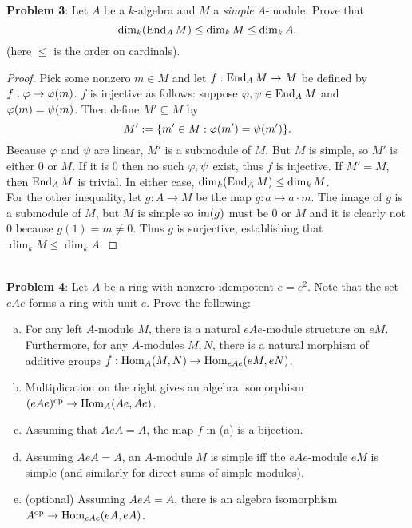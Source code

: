 \documentclass{amsart}
\begin{document}
\newpage
\noindent \textbf{Problem 3}: Let $A$ be a $k$-algebra and $M$ a \textit{simple} $A$-module. Prove that 
$$\dim_k(\operatorname{End}_A M) \leq \dim_k M \leq \dim_k A.$$
(here $\leq$ is the order on cardinals).

\begin{proof}
	Pick some nonzero $m\in M$ and let $f:\operatorname{End}_A M \to M$ be defined by $f:\varphi\mapsto \varphi(m)$. $f$ is injective as follows: suppose $\varphi,\psi\in \operatorname{End}_A M$ and $\varphi(m)=\psi(m)$. Then define $M'\subseteq M$ by
	$$
	M' := \{m'\in M: \varphi(m')=\psi(m')\}.
	$$
	Because $\varphi$ and $\psi$ are linear, $M'$ is a submodule of $M$. But $M$ is simple, so $M'$ is either $0$ or $M$. If it is $0$ then no such $\varphi,\psi$ exist, thus $f$ is injective. If $M'=M$, then $\operatorname{End}_A M$ is trivial. In either case, $\dim_k(\operatorname{End}_AM) \leq \dim_k M$.\\
	
	For the other inequality, let $g:A\to M$ be the map $g:a\mapsto a\cdot m$. The image of $g$ is a submodule of $M$, but $M$ is simple so $\operatorname{im}(g)$ must be $0$ or $M$ and it is clearly not $0$ because $g(1)=m\neq 0$. Thus $g$ is surjective, establishing that $\dim_kM \leq \dim_k A$.
\end{proof}\\

\newpage
\noindent \textbf{Problem 4}: Let $A$ be a ring with nonzero idempotent $e=e^2$. Note that the set $eAe$ forms a ring with unit $e$. Prove the following:
\begin{enumerate}[(a)]
	\item For any left $A$-module $M$, there is a natural $eAe$-module structure on $eM$. Furthermore, for any $A$-modules $M,N$, there is a natural morphism of additive groups $f:\operatorname{Hom}_A(M,N)\to \operatorname{Hom}_{eAe}(eM,eN)$.
	\item Multiplication on the right gives an algebra isomorphism $(eAe)^{\rm{op}} \to \operatorname{Hom}_A(Ae,Ae)$.
	\item Assuming that $AeA=A$, the map $f$ in (a) is a bijection.
	\item Assuming $AeA=A$, an $A$-module $M$ is simple iff the $eAe$-module $eM$ is simple (and similarly for direct sums of simple modules).
	\item (optional) Assuming $AeA=A$, there is an algebra isomorphism $A^{\rm{op}}\to \operatorname{Hom}_{eAe}(eA,eA)$.
\end{enumerate}
\end{document}
